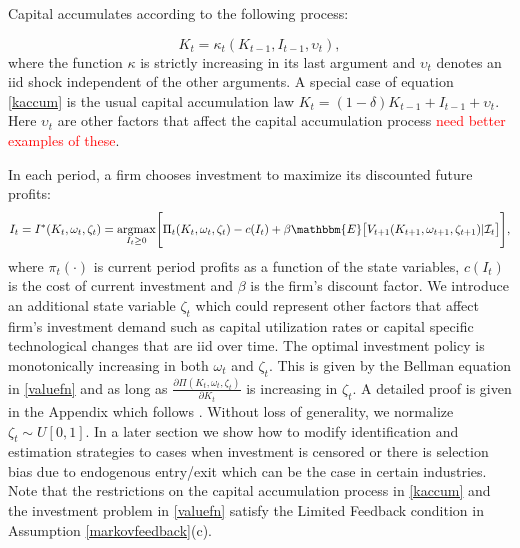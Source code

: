 \documentclass{article}
\begin{document}
Capital accumulates according to the following process:

\begin{equation} \label{kaccum}
K_{t}=\kappa_{t}(K_{t-1}, I_{t-1}, \upsilon_{t}),
\end{equation}
where the function $\kappa$ is strictly increasing in its last argument and $\upsilon_{t}$ denotes an iid shock independent of the other arguments. A special case of equation \eqref{kaccum} is the usual capital accumulation law $K_{t}=(1-\delta)K_{t-1}+I_{t-1}+\upsilon_{t}$. Here $\upsilon_{t}$ are other factors that affect the capital accumulation process \textcolor{red}{need better examples of these}.

In each period, a firm chooses investment to maximize its discounted future profits:
\begin{equation} \label{valuefn}
I_{t}=I^{*}(K_{t}, \omega_{t}, \zeta_{t})=\underset{I_{t}\geq 0}{\operatorname{argmax}}\Bigg[\Pi_{t}(K_{t}, \omega_{t}, \zeta_{t})-c(I_{t})+\beta\mathbbm{E}\big[V_{t+1}(K_{t+1}, \omega_{t+1}, \zeta_{t+1})|\mathcal{I}_{t}\big]\Bigg],
\end{equation}
where $\pi_{t}(\cdot)$ is current period profits as a function of the state variables, $c(I_{t})$ is the cost of current investment and $\beta$ is the firm's discount factor. We introduce an additional state variable $\zeta_{t}$ which could represent other factors that affect firm's investment demand such as capital utilization rates or capital specific technological changes that are iid over time. The optimal investment policy is monotonically increasing in both $\omega_{t}$ and $\zeta_{t}$. This is given by the Bellman equation in \eqref{valuefn} and as long as $\frac{\partial \Pi(K_{t}, \omega_{t}, \zeta_{t})}{\partial K_{t}}$ is increasing in $\zeta_{t}$. A detailed proof is given in the Appendix which follows \cite{Pakesa}. Without loss of generality, we normalize $\zeta_{t}\sim U[0,1]$. In a later section we show how to modify identification and estimation strategies to cases when investment is censored or there is selection bias due to endogenous entry/exit which can be the case in certain industries. Note that the restrictions on the capital accumulation process in \eqref{kaccum} and the investment problem in \eqref{valuefn} satisfy the Limited Feedback condition in Assumption \eqref{markovfeedback}(c).
\end{document}
